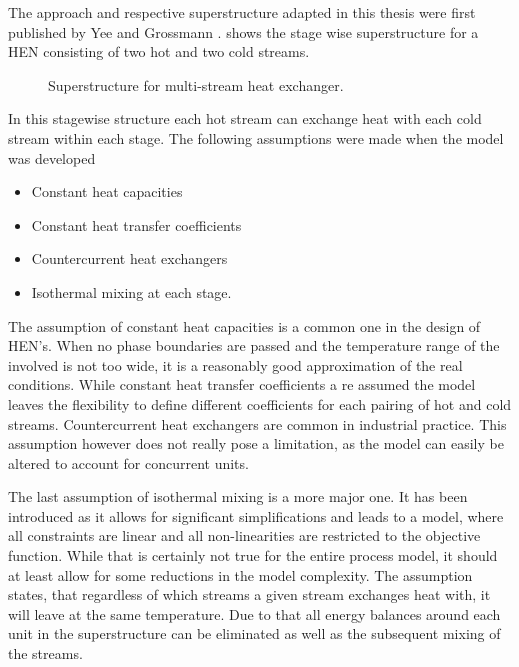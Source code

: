     The approach and respective superstructure adapted in this thesis were first published by Yee and Grossmann
    \cite{Yee.1990}.  shows the stage wise superstructure for a HEN consisting of two hot
    and two cold streams.

    \begin{figure}
        
        \caption{Superstructure for multi-stream heat exchanger. \cite{Yee.1990}}
        \label{fig:HX_super}
    \end{figure}

    In this stagewise structure each hot stream can exchange heat with each cold stream within each stage.
    The following assumptions were made when the model was developed
    \begin{itemize}
        \item Constant heat capacities
        \item Constant heat transfer coefficients
        \item Countercurrent heat exchangers
        \item Isothermal mixing at each stage.
    \end{itemize}

    The assumption of constant heat capacities is a common one in the design of HEN's. When no phase boundaries are passed
    and the temperature range of the involved is not too wide, it is a reasonably good approximation of the real conditions.
    While constant heat transfer coefficients a re assumed the model leaves the flexibility to define different
    coefficients for each pairing of hot and cold streams. Countercurrent heat exchangers are common in industrial practice.
    This assumption however does not really pose a limitation, as the model can easily be altered to account for concurrent
    units.

    The last assumption of isothermal mixing is a more major one. It has been introduced as it allows for significant
    simplifications and leads to a model, where all constraints are linear and all non-linearities are restricted
    to the objective function. While that is certainly not true for the entire process model, it should at least
    allow for some reductions in the model complexity. The assumption states, that regardless of which streams a
    given stream exchanges heat with, it will leave at the same temperature. Due to that all energy balances around
    each unit in the superstructure can be eliminated as well as the subsequent mixing of the streams.

